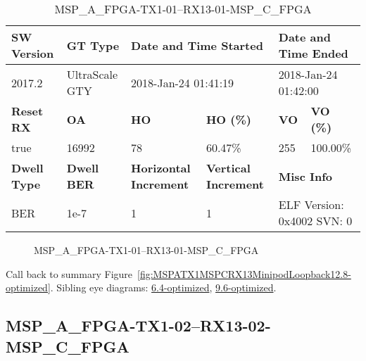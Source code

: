 \begin{table}[h]
\centering
\caption{MSP\_A\_FPGA-TX1-01--RX13-01-MSP\_C\_FPGA}
\label{tab:MSPAFPGATX101RX1301MSPCFPGA12.8-optimized}
\begin{tabular}{@{}|l|l|l|l|l|l|@{}}
\toprule
\textbf{SW Version}                & \textbf{GT Type}   & \multicolumn{2}{l|}{\textbf{Date and Time Started}}            & \multicolumn{2}{l|}{\textbf{Date and Time Ended}}        \\ \midrule
2017.2                       & UltraScale GTY          & \multicolumn{2}{l|}{2018-Jan-24 01:41:19}                   & \multicolumn{2}{l|}{2018-Jan-24 01:42:00}               \\ \midrule
\textbf{Reset RX}                  & \textbf{OA} & \textbf{HO}   & \textbf{HO (\%)} & \textbf{VO} & \textbf{VO (\%)} \\ \midrule
true & 16992        & 78          & 60.47\%        & 255        & 100.00\%       \\ \midrule
\textbf{Dwell Type}                & \textbf{Dwell BER} & \textbf{Horizontal Increment} & \textbf{Vertical Increment}    & \multicolumn{2}{l|}{\textbf{Misc Info}}                  \\ \midrule
BER                            & 1e-7        & 1        & 1           & \multicolumn{2}{l|}{ELF Version: 0x4002 SVN: 0}                         \\ \bottomrule
\end{tabular}
\end{table}

\begin{figure}[h]
\caption{MSP\_A\_FPGA-TX1-01--RX13-01-MSP\_C\_FPGA} \label{fig:MSPAFPGATX101RX1301MSPCFPGA12.8-optimized}
\end{figure}

Call back to summary Figure~\ref{fig:MSPATX1MSPCRX13MinipodLoopback12.8-optimized}.
Sibling eye diagrams: \hyperref[sec:MSPAFPGATX101RX1301MSPCFPGA6.4-optimized]{6.4-optimized}, \hyperref[sec:MSPAFPGATX101RX1301MSPCFPGA9.6-optimized]{9.6-optimized}.

\clearpage
\newpage


\subsection{MSP\_A\_FPGA-TX1-02--RX13-02-MSP\_C\_FPGA}\label{sec:MSPAFPGATX102RX1302MSPCFPGA12.8-optimized}


